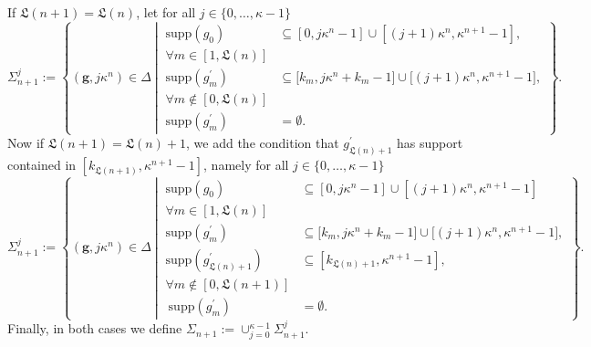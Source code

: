 \documentclass[english, 11pt, a4paper]{article}
\theoremstyle{definition}
\numberwithin{equation}{section}
\newcommand{\mbfg}{\boldsymbol{g}}
\newcommand{\BZ}{\Delta}
\newcommand{\supp}{\mathrm{supp}}
\newcommand{\Landing}{\mathfrak{L}}
\begin{document}
If $\Landing(n+1)=\Landing (n)$, let for all $j \in \{0, \ldots,\kappa -1\}$
\begin{equation*}
  \Sigma^j_{n+1}
  :=\left\{  \left( \mbfg, j\kappa^n \right)\in \BZ \ \left\vert \
      {\begin{aligned}
          \supp \left(g_0\right) &\subseteq 
          \left[ 0, j \kappa^n-1 \right] \cup \left[ (j+1)\kappa^n, \kappa^{n+1}-1 \right],\\
         \forall m \in [1,\Landing (n)] & \\
          \supp \left(g^\prime_m\right)& \subseteq 
          \big[k_m, j \kappa^n + k_m -1\big] \cup \big[(j+1)\kappa^n, \kappa^{n+1}-1 \big],\\
          \forall m \notin [0,\Landing (n)]& \\
          \supp \left(g^\prime_{m}\right)
          & =  \emptyset.
        \end{aligned}}
    \right. \right\}.
\end{equation*}
Now if $\Landing(n+1)=\Landing (n)+1$, we add the condition that $g^\prime_{\Landing(n)+1}$ has support
contained in $[k_{\Landing(n+1)},\kappa^{n+1}-1]$, namely for all $j \in \{0, \ldots,\kappa -1\}$
\begin{equation*}
  \Sigma^j_{n+1}
  :=\left\{  \left( \mbfg, j\kappa^n \right)\in \BZ \ \left\vert \
    {\begin{aligned}
        \supp \left(g_0\right)& \subseteq
        \left[ 0, j \kappa^n-1 \right]
        \cup \left[ (j+1)\kappa^n, \kappa^{n+1}-1 \right]\\
        \forall m \in [1,\Landing (n)]&\\
        \supp \left(g^\prime_m\right)&\subseteq
        \big[k_m, j \kappa^n + k_m -1\big]%
        \cup \big[(j+1)\kappa^n, \kappa^{n+1}-1 \big],\\
        \supp \left(g^\prime_{\Landing (n)+1}\right) 
        &\subseteq\left[k_{\Landing (n)+1}, \kappa^{n+1}-1 \right], \\
        \forall m \notin [0,\Landing (n+1)] & \\%
       \ \supp \left(g^\prime_{m}\right)
        &= \emptyset.
      \end{aligned}}
                        \right. \right\}.
\end{equation*}
Finally, in both cases we define $\Sigma_{n+1}:= \cup^{\kappa -1}_{j=0} \Sigma^j_{n+1}$.
\end{document}
